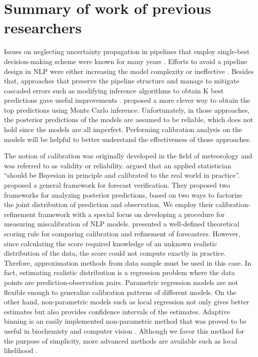 \chapter{Summary of work of previous researchers}
\doublespacenormalsize

Issues on neglecting uncertainty propagation in pipelines that employ single-best decision-making scheme were known for many years \citep{draper1995assessment}. Efforts to avoid a pipeline design in NLP were either increasing the model complexity \citep{singh2013joint, DurrettKlein2014} or ineffective \citep{sutton2005joint}. Besides that, approaches that preserve the pipeline structure and manage to mitigate cascaded errors such as modifying inference algorithms to obtain K best predictions gave useful improvements \citep{huang2005better, toutanova2005joint}. \cite{finkel2006solving} proposed a more clever way to obtain the top predictions using Monte Carlo inference. Unfortunately, in those approaches, the posterior predictions of the models are assumed to be reliable, which does not hold since the models are all imperfect. Performing calibration analysis on the models will be helpful to better understand the effectiveness of those approaches.

The notion of calibration was originally developed in the field of meteorology \citep{miller1962statistical, murphy1973new} and was referred to as validity or reliability. \cite{rubin1984bayesianly} argued that an applied statistician ``should be Bayesian in principle and calibrated to the real world in practice''. \cite{murphy1984probability} proposed a general framework for forecast verification. They proposed two frameworks for analyzing posterior predictions, based on two ways to factorize the joint distribution of prediction and observation. We employ their calibration-refinement framework with a special focus on developing a procedure for measuring miscalibration of NLP models. \cite{degroot1983comparison} presented a well-defined theoretical scoring rule for comparing calibration and refinement of forecasters. However, since calculating the score required knowledge of an unknown realistic distribution of the data, the score could not compute exactly in practice. Threfore, approximation methods from data sample must be used in this case. In fact, estimating realistic distribution is a regression problem where the data points are prediction-observation pairs. Parametric regression models are not flexible enough to generalize calibration patterns of different models. On the other hand, non-parametric models such as local regression \citep{wasserman2006all} not only gives better estimates but also provides confidence intervals of the estimates. Adaptive binning is an easily implemented non-parametric method that was proved to be useful in biochemisty and computer vision \citep{davis2007adaptive, leow2004analysis}. Although we favor this method for the purpose of simplicity, more advanced methods are available such as local likelihood \citep{frolich2006non}.  

